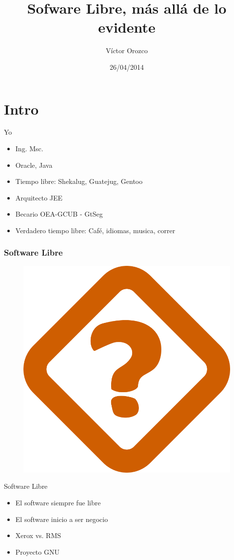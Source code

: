 \documentclass{beamer}
\title{Sofware Libre, más allá de lo evidente}
\author{Víctor Orozco}
\institute{Shekalug}
\date{26/04/2014}
\begin{document}
\frame{\titlepage}

\section{Intro}

\begin{frame}{Yo}
    \begin{itemize}
    \item Ing. Msc.
    \item Oracle, Java
    \item Tiempo libre: Shekalug, Guatejug, Gentoo
    \item Arquitecto JEE
    \item Becario OEA-GCUB - GtSeg
    \item Verdadero tiempo libre: Café, idiomas, musica, correr
    \end{itemize}
\end{frame}

\begin{frame}
\frametitle{Software Libre}
    \begin{figure}[tbph]
        \centering
        \includegraphics[width=0.5\linewidth]{Images/why.png}
        \label{fig:CyberCommand}
    \end{figure}
\end{frame}


\begin{frame}{Software Libre}
    \begin{itemize}
        \item El software siempre fue libre
        \item El software inicio a ser negocio
        \item Xerox vs. RMS
        \item Proyecto GNU
    \end{itemize}
\end{frame}
\end{document}
